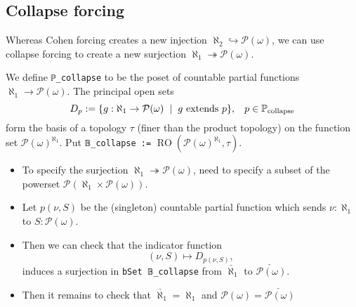 \documentclass[sigplan,10pt,review, anonymous]{acmart}
\theoremstyle{definition}
\begin{document}
\subsection{Collapse forcing} \label{subsection:collapse}

Whereas Cohen forcing creates a new injection \(\aleph_2 \hookrightarrow \mathcal{P}(\omega)\), we can use collapse forcing to create a new surjection \(\aleph_1 \twoheadrightarrow \mathcal{P}(\omega)\).

\begin{definition}\label{def-collapse-poset}
  We define \lstinline{ℙ_collapse} to be the poset of countable partial functions \(\aleph_1 \to \mathcal{P}(\omega)\). The principal open sets \[D_p := \{g : \aleph_1 \to \mathcal{P}(\omega) \hspace{2mm} | \hspace{2mm} g \text{ extends } p\} , \hspace{3mm} p \in \mathbb{P}_{\text{collapse}}\] form the basis of a topology \(\tau\) (finer than the product topology) on the function set \(\mathcal{P}(\omega)^{\aleph_1}\). Put \lstinline{𝔹_collapse :=} \(\operatorname{RO}\left(\mathcal{P}(\omega)^{\aleph_1}, \tau\right)\).
\end{definition}

\begin{itemize}
 \item To specify the surjection \(\aleph_1 \twoheadrightarrow \mathcal{P}(\omega)\), need to specify a subset of the powerset \(\mathcal{P}(\aleph_1 \times \mathcal{P}(\omega))\).

 \item Let \(p(\nu, S)\) be the (singleton) countable partial function which sends \(\nu : \aleph_1\) to \(S : \mathcal{P}(\omega)\).

 \item Then we can check that the indicator function
\[ (\nu, S) \mapsto D_{p(\nu,S)}, \]
induces a surjection in \lstinline{bSet 𝔹_collapse} from \(\check{\aleph_1}\) to \(\check{\mathcal{P}(\omega)}\).

 \item Then it remains to check that \(\check{\aleph_1} = \aleph_1\) and \(\mathcal{P}(\omega) = \check{\mathcal{P}(\omega)}\)
\end{itemize}
\end{document}
